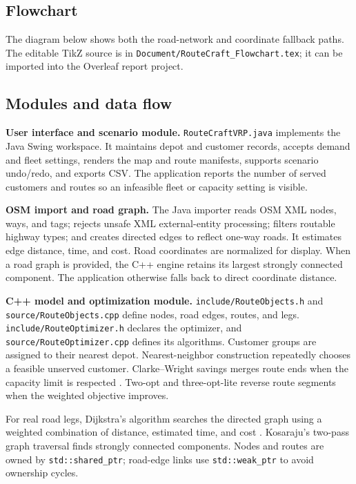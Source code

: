 \documentclass[11pt,a4paper]{article}
\begin{document}
\subsection{Flowchart}
The diagram below shows both the road-network and coordinate fallback paths.
The editable TikZ source is in \texttt{Document/RouteCraft\_Flowchart.tex};
it can be imported into the Overleaf report project.

\begin{center}

\end{center}

\subsection{Modules and data flow}
\textbf{User interface and scenario module.}
\texttt{RouteCraftVRP.java} implements the Java Swing workspace. It
maintains depot and customer records, accepts demand and fleet settings,
renders the map and route manifests, supports scenario undo/redo, and exports
CSV. The application reports the number of served customers and routes so an
infeasible fleet or capacity setting is visible.

\textbf{OSM import and road graph.}
The Java importer reads OSM XML nodes, ways, and tags; rejects unsafe XML
external-entity processing; filters routable highway types; and creates
directed edges to reflect one-way roads. It estimates edge distance, time,
and cost. Road coordinates are normalized for display. When a road graph is
provided, the C++ engine retains its largest strongly connected component.
The application otherwise falls back to direct coordinate distance.

\textbf{C++ model and optimization module.}
\texttt{include/RouteObjects.h} and
\texttt{source/RouteObjects.cpp} define nodes, road edges, routes, and legs.
\texttt{include/RouteOptimizer.h} declares the optimizer, and
\texttt{source/RouteOptimizer.cpp} defines its algorithms. Customer groups
are assigned to their nearest depot. Nearest-neighbor construction repeatedly
chooses a feasible unserved customer. Clarke--Wright savings merges route
ends when the capacity limit is respected \cite{clarke1964}. Two-opt and
three-opt-lite reverse route segments when the weighted objective improves.

For real road legs, Dijkstra's algorithm searches the directed graph using a
weighted combination of distance, estimated time, and cost
\cite{dijkstra1959}. Kosaraju's two-pass graph traversal finds strongly
connected components. Nodes and routes are owned by \texttt{std::shared\_ptr};
road-edge links use \texttt{std::weak\_ptr} to avoid ownership cycles.
\end{document}
